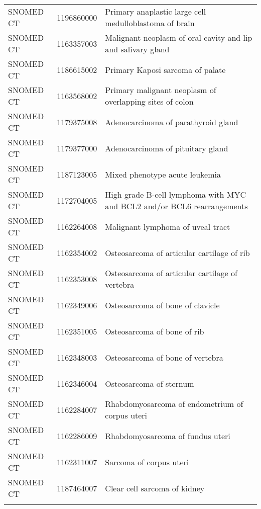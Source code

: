 \begin{longtable}{p{}p{}p{}}
  SNOMED CT & 1196860000 & Primary anaplastic large cell medulloblastoma of brain \\ 
  SNOMED CT & 1163357003 & Malignant neoplasm of oral cavity and lip and salivary gland \\ 
  SNOMED CT & 1186615002 & Primary Kaposi sarcoma of palate \\ 
  SNOMED CT & 1163568002 & Primary malignant neoplasm of overlapping sites of colon \\ 
  SNOMED CT & 1179375008 & Adenocarcinoma of parathyroid gland \\ 
  SNOMED CT & 1179377000 & Adenocarcinoma of pituitary gland \\ 
  SNOMED CT & 1187123005 & Mixed phenotype acute leukemia \\ 
  SNOMED CT & 1172704005 & High grade B-cell lymphoma with MYC and BCL2 and/or BCL6 rearrangements \\ 
  SNOMED CT & 1162264008 & Malignant lymphoma of uveal tract \\ 
  SNOMED CT & 1162354002 & Osteosarcoma of articular cartilage of rib \\ 
  SNOMED CT & 1162353008 & Osteosarcoma of articular cartilage of vertebra \\ 
  SNOMED CT & 1162349006 & Osteosarcoma of bone of clavicle \\ 
  SNOMED CT & 1162351005 & Osteosarcoma of bone of rib \\ 
  SNOMED CT & 1162348003 & Osteosarcoma of bone of vertebra \\ 
  SNOMED CT & 1162346004 & Osteosarcoma of sternum \\ 
  SNOMED CT & 1162284007 & Rhabdomyosarcoma of endometrium of corpus uteri \\ 
  SNOMED CT & 1162286009 & Rhabdomyosarcoma of fundus uteri \\ 
  SNOMED CT & 1162311007 & Sarcoma of corpus uteri \\ 
  SNOMED CT & 1187464007 & Clear cell sarcoma of kidney \\ 
  \hline
\label{tab:codes_cancer}
\end{longtable}
